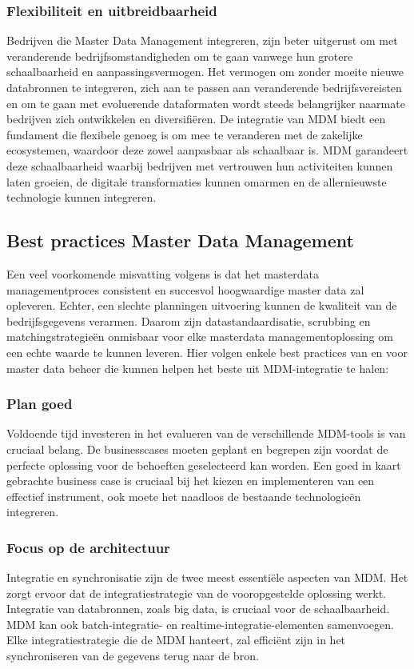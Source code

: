 \subsubsection{Flexibiliteit en uitbreidbaarheid}
Bedrijven die Master Data Management integreren, zijn beter uitgerust om met veranderende bedrijfsomstandigheden om te gaan vanwege hun grotere schaalbaarheid en aanpassingsvermogen. Het vermogen om zonder moeite nieuwe databronnen te integreren, zich aan te passen aan veranderende bedrijfsvereisten en om te gaan met evoluerende dataformaten wordt steeds belangrijker naarmate bedrijven zich ontwikkelen en diversifiëren. De integratie van MDM biedt een fundament die flexibele genoeg is om mee te veranderen met de zakelijke ecosystemen, waardoor deze zowel aanpasbaar als schaalbaar is. MDM garandeert deze schaalbaarheid waarbij bedrijven met vertrouwen hun activiteiten kunnen laten groeien, de digitale transformaties kunnen omarmen en de allernieuwste technologie kunnen integreren.

\subsection{Best practices Master Data Management}
Een veel voorkomende misvatting volgens \textcite{Raghavendra2023} is dat het masterdata managementproces consistent en succesvol hoogwaardige master data zal opleveren. Echter, een slechte planningen uitvoering kunnen de kwaliteit van de bedrijfsgegevens verarmen. Daarom zijn datastandaardisatie, scrubbing en matchingstrategieën onmisbaar voor elke masterdata managementoplossing om een echte waarde te kunnen leveren.
Hier volgen enkele best practices van \textcite{Raghavendra2023} en \textcite{Sharma2023} voor master data beheer die kunnen helpen het beste uit MDM-integratie te halen:

\subsubsection{Plan goed}
Voldoende tijd investeren in het evalueren van de verschillende MDM-tools is van cruciaal belang. De businesscases moeten geplant en begrepen zijn voordat de perfecte oplossing voor de behoeften geselecteerd kan worden. Een goed in kaart gebrachte business case is cruciaal bij het kiezen en implementeren van een effectief instrument, ook moete het naadloos de bestaande technologieën integreren.

\subsubsection{Focus op de architectuur}
Integratie en synchronisatie zijn de twee meest essentiële aspecten van MDM. Het zorgt ervoor dat de integratiestrategie van de vooropgestelde oplossing werkt. Integratie van databronnen, zoals big data, is cruciaal voor de schaalbaarheid. MDM kan ook batch-integratie- en realtime-integratie-elementen samenvoegen. Elke integratiestrategie die de MDM hanteert, zal efficiënt zijn in het synchroniseren van de gegevens terug naar de bron.

